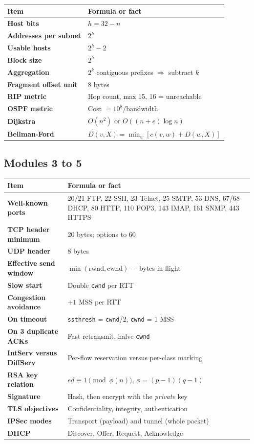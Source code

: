 \documentclass[11pt,a4paper]{article}
\begin{document}
\begin{center}\small
\begin{tabularx}{\textwidth}{>{\bfseries}p{} X}
\toprule Item & Formula or fact\\
\midrule
Host bits & $h = 32 - n$\\
Addresses per subnet & $2^h$\\
Usable hosts & $2^h - 2$\\
Block size & $2^h$\\
Aggregation & $2^k$ contiguous prefixes $\Rightarrow$ subtract $k$\\
Fragment offset unit & 8 bytes\\
RIP metric & Hop count, max 15, 16 = unreachable\\
OSPF metric & Cost $= 10^8 / \text{bandwidth}$\\
Dijkstra & $O(n^2)$ or $O((n+e)\log n)$\\
Bellman-Ford & $D(v,X) = \min_w [c(v,w) + D(w,X)]$\\
\bottomrule
\end{tabularx}
\end{center}

\subsection{Modules 3 to 5}

\begin{center}\small
\begin{tabularx}{\textwidth}{>{\bfseries}p{} X}
\toprule Item & Formula or fact\\
\midrule
Well-known ports & 20/21 FTP, 22 SSH, 23 Telnet, 25 SMTP, 53 DNS, 67/68 DHCP, 80 HTTP, 110 POP3, 143 IMAP, 161 SNMP, 443 HTTPS\\
TCP header minimum & 20 bytes; options to 60\\
UDP header & 8 bytes\\
Effective send window & $\min(\text{rwnd}, \text{cwnd}) - $ bytes in flight\\
Slow start & Double \texttt{cwnd} per RTT\\
Congestion avoidance & $+1$ MSS per RTT\\
On timeout & \texttt{ssthresh} = \texttt{cwnd}/2, \texttt{cwnd} = 1 MSS\\
On 3 duplicate ACKs & Fast retransmit, halve \texttt{cwnd}\\
IntServ versus DiffServ & Per-flow reservation versus per-class marking\\
RSA key relation & $ed \equiv 1 \pmod{\phi(n)}$, $\phi = (p-1)(q-1)$\\
Signature & Hash, then encrypt with the \emph{private} key\\
TLS objectives & Confidentiality, integrity, authentication\\
IPSec modes & Transport (payload) and tunnel (whole packet)\\
DHCP & Discover, Offer, Request, Acknowledge\\
\bottomrule
\end{tabularx}
\end{center}
\end{document}
